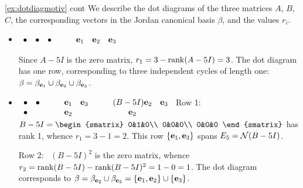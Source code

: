 \begin{example*}{\ref{ex:dotdiagmotiv} cont}{}
We describe the dot diagrams of the three matrices $A$, $B$, $C$, the corresponding vectors in the Jordan canonical basis $\beta$, and the values $r_i$.
\begin{itemize}
	\item[$A:$] $\begin{array}{ccc}
			\bullet&\bullet&\bullet
		\end{array}
		\qquad
		\begin{array}{ccc}
			{\mathbf{e}}_1&{\mathbf{e}}_2&{\mathbf{e}}_3
		\end{array}$\par
		Since $A-5I$ is the zero matrix, $r_1=3-\operatorname{rank}(A-5I)=3$. The dot diagram has one row, corresponding to three independent cycles of length one: $\beta=\beta_{{\mathbf{e}}_1}\cup\beta_{{\mathbf{e}}_2}\cup\beta_{{\mathbf{e}}_3}$.
		
	\item[$B:$] $\begin{array}[t]{cc}
			\bullet&\bullet\\
			\bullet
		\end{array}
		\qquad
		\begin{array}[t]{cc}
			{\mathbf{e}}_1&{\mathbf{e}}_3\\
			{\mathbf{e}}_2
		\end{array}
		\qquad
		\begin{array}[t]{cc}
			(B-5I){\mathbf{e}}_2&{\mathbf{e}}_3\\
			{\mathbf{e}}_2
		\end{array}$\smallbreak
		Row 1: \ $B-5I=
		\begin{smatrix}
			0&1&0\\
			0&0&0\\
			0&0&0
		\end{smatrix}$
		has rank 1, whence $r_1=3-1=2$. This row $\{{\mathbf{e}}_1,{\mathbf{e}}_3\}$ spans $E_5=\mathcal{N}(B-5I)$.\par
		Row 2: \ $(B-5I)^2$ is the zero matrix, whence $r_2=\operatorname{rank}(B-5I)-\operatorname{rank}(B-5I)^2=1-0=1$.\smallbreak
		The dot diagram corresponds to $\beta=\beta_{{\mathbf{e}}_2}\cup\beta_{{\mathbf{e}}_3}=\{{\mathbf{e}}_1,{\mathbf{e}}_2\}\cup\{{\mathbf{e}}_3\}$.
		

\end{itemize}
\end{example*}
